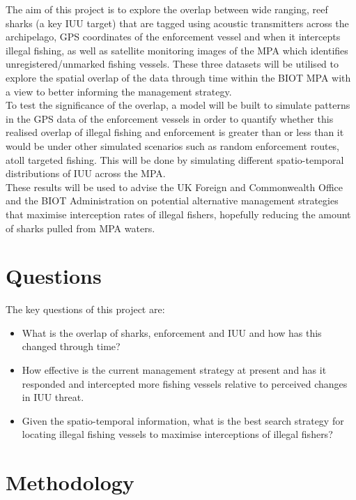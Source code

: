 \documentclass[11pt]{article}
\begin{document}
The aim of this project is to explore the overlap between wide ranging, reef sharks (a key IUU target) that are tagged using acoustic transmitters across the archipelago, GPS coordinates of the enforcement vessel and when it intercepts illegal fishing, as well as  satellite monitoring images of the MPA which identifies unregistered/unmarked fishing vessels. These three datasets will be utilised to explore the spatial overlap of the data through time within the BIOT MPA with a view to better informing the management strategy. \\
To test the significance of the overlap, a model will be built to simulate patterns in the GPS data of the enforcement vessels in order to quantify whether this realised overlap of illegal fishing and enforcement is greater than or less than it would be under other simulated scenarios such as random enforcement routes, atoll targeted fishing. This will be done by simulating different spatio-temporal distributions of IUU across the MPA. \\
These results will be used to advise the UK Foreign and Commonwealth Office and the BIOT Administration on potential alternative management strategies that maximise interception rates of illegal fishers, hopefully reducing the amount of sharks pulled from MPA waters. 

	\section{Questions}
\noindent

The key questions of this project are:
	\begin{itemize}
	\item What is the overlap of sharks, enforcement and IUU and how has this changed through time?
	\item How effective is the current management strategy at present and has it responded and intercepted more fishing vessels relative to perceived changes in IUU threat. 
	\item Given the spatio-temporal information, what is the best search strategy for locating illegal fishing vessels to maximise interceptions of illegal fishers? 
	\end{itemize}


	\section{Methodology}
\noindent
\end{document}
